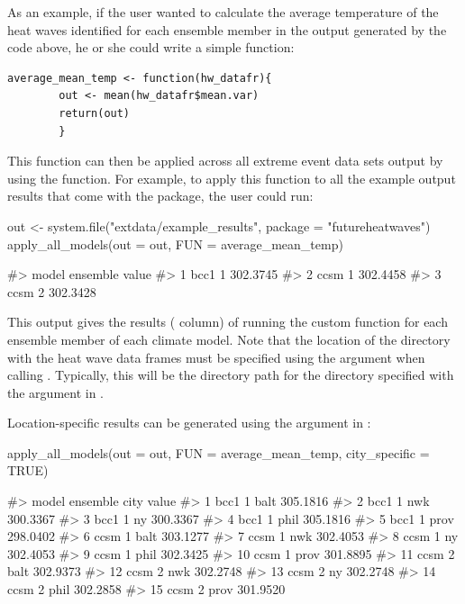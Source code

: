 As an example, if the user wanted to calculate the average temperature
of the heat waves identified for each ensemble member in the output
generated by the code above, he or she could write a simple function:

\begin{verbatim}
average_mean_temp <- function(hw_datafr){
        out <- mean(hw_datafr$mean.var)
        return(out)
        }
\end{verbatim}

\noindent This function can then be applied across all extreme event
data sets output by  using the
 function. For example, to apply this function
to all the example output results that come with the package, the user
could run:

\begin{Schunk}
\begin{Sinput}
out <- system.file("extdata/example_results", package = "futureheatwaves")
apply_all_models(out = out, FUN = average_mean_temp)
\end{Sinput}
\begin{Soutput}
#>   model ensemble    value
#> 1  bcc1        1 302.3745
#> 2  ccsm        1 302.4458
#> 3  ccsm        2 302.3428
\end{Soutput}
\end{Schunk}

This output gives the results ( column) of running the
custom function for each ensemble member of each climate model. Note
that the location of the directory with the heat wave data frames must
be specified using the  argument when calling
. Typically, this will be the directory path
for the directory specified with the  argument in
.

Location-specific results can be generated using the
 argument in :

\begin{Schunk}
\begin{Sinput}
apply_all_models(out = out, FUN = average_mean_temp, city_specific = TRUE)
\end{Sinput}
\begin{Soutput}
#>    model ensemble city    value
#> 1   bcc1        1 balt 305.1816
#> 2   bcc1        1  nwk 300.3367
#> 3   bcc1        1   ny 300.3367
#> 4   bcc1        1 phil 305.1816
#> 5   bcc1        1 prov 298.0402
#> 6   ccsm        1 balt 303.1277
#> 7   ccsm        1  nwk 302.4053
#> 8   ccsm        1   ny 302.4053
#> 9   ccsm        1 phil 302.3425
#> 10  ccsm        1 prov 301.8895
#> 11  ccsm        2 balt 302.9373
#> 12  ccsm        2  nwk 302.2748
#> 13  ccsm        2   ny 302.2748
#> 14  ccsm        2 phil 302.2858
#> 15  ccsm        2 prov 301.9520
\end{Soutput}
\end{Schunk}

